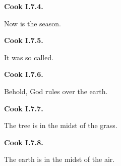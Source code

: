 \par\begin{minipage}{\linewidth}\raggedright
\textbf{Cook I.7.4.}

Now is the season.

\end{minipage}\par\addvspace{4pt}

\par\begin{minipage}{\linewidth}\raggedright
\textbf{Cook I.7.5.}

It was so called.

\end{minipage}\par\addvspace{4pt}

\par\begin{minipage}{\linewidth}\raggedright
\textbf{Cook I.7.6.}

Behold, God rules over the earth.

\end{minipage}\par\addvspace{4pt}

\par\begin{minipage}{\linewidth}\raggedright
\textbf{Cook I.7.7.}

The tree is in the midst of the grass.

\end{minipage}\par\addvspace{4pt}

\par\begin{minipage}{\linewidth}\raggedright
\textbf{Cook I.7.8.}

The earth is in the midst of the air.

\end{minipage}\par\addvspace{4pt}

